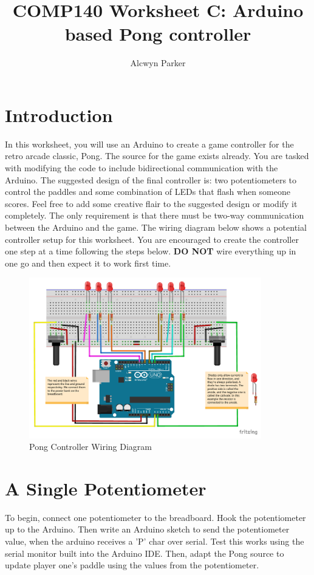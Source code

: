 \documentclass{../../../../fal_assignment}
\title{COMP140 Worksheet C: Arduino based Pong controller}
\author{Alcwyn Parker}
\begin{document}
\maketitle

\section*{Introduction}
In this worksheet, you will use an Arduino to create a game controller for the retro arcade classic, Pong. The source for the game exists already. You are tasked with modifying the code to include bidirectional communication with the Arduino. The suggested design of the final controller is: two potentiometers to control the paddles and some combination of LEDs that flash when someone scores. Feel free to add some creative flair to the suggested design or modify it completely. The only requirement is that there must be two-way communication between the Arduino and the game. The wiring diagram below shows a potential controller setup for this worksheet. You are encouraged to create the controller one step at a time following the steps below. \textbf{DO NOT} wire everything up in one go and then expect it to work first time. 

\begin{figure}[!h]
	\begin{center}
		\includegraphics[width=0.9\textwidth]{assets/arduino-pong.pdf}
	\end{center}
	\caption{Pong Controller Wiring Diagram}
	\label{fig:wiring}
\end{figure}

\section{A Single Potentiometer} \label{arduino-first}
To begin, connect one potentiometer to the breadboard. Hook the potentiometer up to the Arduino. Then write an Arduino sketch to send the potentiometer value, when the arduino receives a 'P' char over serial. Test this works using the serial monitor built into the Arduino IDE. Then, adapt the Pong source to update player one's paddle using the values from the potentiometer. 
\end{document}
